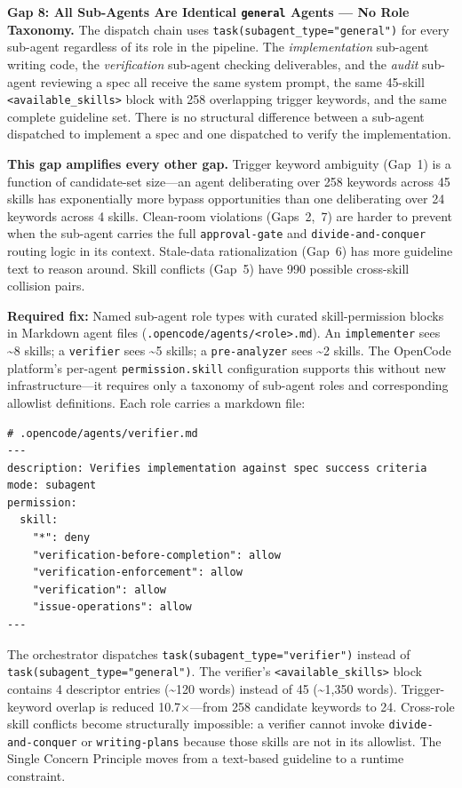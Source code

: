 \documentclass[11pt,a4paper]{article}
\begin{document}
\begin{gapbox}
\textbf{Gap 8: All Sub-Agents Are Identical \texttt{general} Agents --- No Role Taxonomy.}
The dispatch chain uses \texttt{task(subagent\_type="general")} for every
sub-agent regardless of its role in the pipeline.  The
\emph{implementation} sub-agent writing code, the \emph{verification}
sub-agent checking deliverables, and the \emph{audit} sub-agent reviewing
a spec all receive the same system prompt, the same 45-skill
\texttt{<available\_skills>} block with 258 overlapping trigger keywords,
and the same complete guideline set.  There is no structural difference
between a sub-agent dispatched to implement a spec and one dispatched
to verify the implementation.

\textbf{This gap amplifies every other gap.}  Trigger keyword ambiguity
(Gap~1) is a function of candidate-set size---an agent deliberating over
258 keywords across 45 skills has exponentially more bypass opportunities
than one deliberating over 24 keywords across 4 skills.  Clean-room
violations (Gaps~2,~7) are harder to prevent when the sub-agent carries
the full \texttt{approval-gate} and \texttt{divide-and-conquer} routing
logic in its context.  Stale-data rationalization (Gap~6) has more
guideline text to reason around.  Skill conflicts (Gap~5) have 990
possible cross-skill collision pairs.

\textbf{Required fix:} Named sub-agent role types with curated
skill-permission blocks in Markdown agent files
(\texttt{.opencode/agents/<role>.md}).  An \texttt{implementer} sees
\textasciitilde{}8 skills; a \texttt{verifier} sees \textasciitilde{}5
skills; a \texttt{pre-analyzer} sees \textasciitilde{}2 skills.  The
OpenCode platform's per-agent \texttt{permission.skill} configuration
supports this without new infrastructure---it requires only a taxonomy
of sub-agent roles and corresponding allowlist definitions.  Each role
carries a markdown file:

\begin{lstlisting}[style=pseudocode, language={}]
# .opencode/agents/verifier.md
---
description: Verifies implementation against spec success criteria
mode: subagent
permission:
  skill:
    "*": deny
    "verification-before-completion": allow
    "verification-enforcement": allow
    "verification": allow
    "issue-operations": allow
---
\end{lstlisting}

The orchestrator dispatches \texttt{task(subagent\_type="verifier")}
instead of \texttt{task(subagent\_type="general")}.  The verifier's
\texttt{<available\_skills>} block contains 4 descriptor entries
(\textasciitilde{}120 words) instead of 45 (\textasciitilde{}1,350
words).  Trigger-keyword overlap is reduced 10.7$\times$---from 258
candidate keywords to 24.  Cross-role skill conflicts become structurally
impossible: a verifier cannot invoke \texttt{divide-and-conquer} or
\texttt{writing-plans} because those skills are not in its allowlist.
The Single Concern Principle moves from a text-based guideline to a
runtime constraint.
\end{gapbox}
\end{document}
